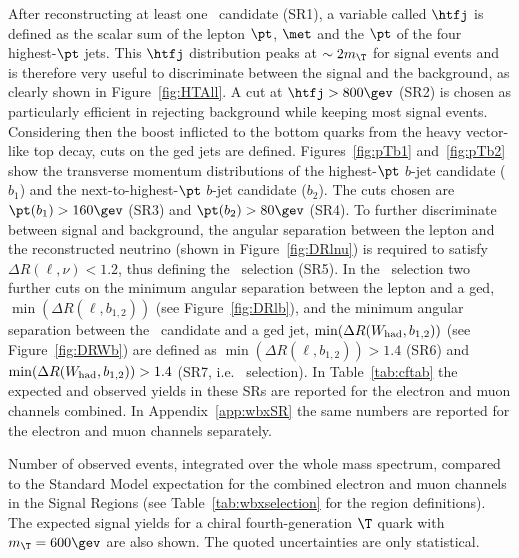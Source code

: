 After reconstructing at least one \whad\ candidate (SR1), a variable called $\htfj$ is defined
as the scalar sum of the lepton $\pt$, $\met$ and the $\pt$
of the four  highest-$\pt$ jets. This $\htfj$ distribution peaks at 
$\sim 2 m_{\T}$ for signal events and is therefore very useful to
discriminate between the signal and the background, as clearly shown
in Figure~\ref{fig:HTAll}. A cut at $\htfj>800\gev$ (SR2) is chosen as particularly
efficient in rejecting background while keeping most signal events.
Considering then the boost inflicted to the bottom quarks from the heavy
vector-like top decay, cuts on the \btag ged jets are defined.
Figures~\ref{fig:pTb1} and~\ref{fig:pTb2} show the transverse momentum distributions
of the highest-$\pt$ $b$-jet candidate ($b_1$) and 
the next-to-highest-$\pt$ $b$-jet candidate ($b_2$).
The cuts chosen are $\pt(b_1) > 160\gev$ (SR3) and $\pt(b_2) >80\gev$ (SR4).
To further discriminate between signal and background,
the angular separation between the lepton and the reconstructed neutrino 
(shown in Figure~\ref{fig:DRlnu}) is
required to satisfy $\Delta R(\ell,\nu)<1.2$, thus defining the 
\loose\ selection (SR5). In the \tight\ selection
two further cuts on the minimum angular separation between the lepton and a \btag ged, 
$\min(\Delta R(\ell, b_{1,2}))$ (see Figure~\ref{fig:DRlb}), 
and the minimum angular separation between the
\whad\ candidate and a \btag ged jet,
$\min(\Delta R(W_{\rm had}, b_{1,2}))$ (see Figure~\ref{fig:DRWb}) are defined as
 $\min(\Delta R(\ell, b_{1,2}))>1.4$ (SR6) and 
$\min(\Delta R(W_{\rm had}, b_{1,2}))>1.4$ (SR7, i.e. \tight\ selection).
In Table~\ref{tab:cftab} the expected and observed yields in these SRs are
reported for the electron and muon channels combined. In Appendix~\ref{app:wbxSR}
the same numbers are reported for the  electron and muon channels separately.

\begin{table}[htb]\centering
        
        \caption{Number of observed events, integrated 
          over the whole mass spectrum, compared to the Standard Model expectation for
          the combined electron and muon channels 
          in the Signal Regions (see Table~\ref{tab:wbxselection} for the
        region definitions).
          The expected signal yields for a chiral 
          fourth-generation $\T$ quark with $m_{\T}=600\gev$ are also shown.
          The quoted uncertainties are only statistical.}\label{tab:cftab}
\end{table}



